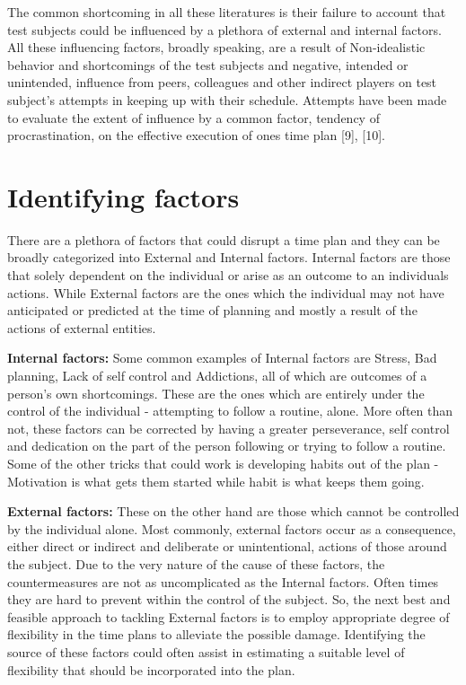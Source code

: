 \documentclass[conference]{IEEEtran}
\begin{document}
The common shortcoming in all these literatures is their failure to account that test subjects could be influenced by a plethora of external and internal factors. All these influencing factors, broadly speaking, are a result of Non-idealistic behavior and shortcomings of the test subjects and negative, intended or unintended, influence from peers, colleagues and other indirect players on test subject's attempts in keeping up with their schedule. Attempts have been made to evaluate the extent of influence by a common factor, tendency of procrastination, on the effective execution of ones time plan [9], [10].


\section{Identifying factors}
There are a plethora of factors that could disrupt a time plan and they can be broadly categorized into External and Internal factors. Internal factors are those that solely dependent on the individual or arise as an outcome to an individuals actions. While External factors are the ones which the individual may not have anticipated or predicted at the time of planning and mostly a result of the actions of external entities.

\textbf{Internal factors:} Some common examples of Internal factors are Stress, Bad planning, Lack of self control and Addictions, all of which are outcomes of a person's own shortcomings. These are the ones which are entirely under the control of the individual - attempting to follow a routine, alone. More often than not, these factors can be corrected by having a greater perseverance, self control and dedication on the part of the person following or trying to follow a routine. Some of the other tricks that could work is developing habits out of the plan - Motivation is what gets them started while habit is what keeps them going.

\textbf{External factors:} These on the other hand are those which cannot be controlled by the individual alone. Most commonly, external factors occur as a consequence, either direct or indirect and deliberate or unintentional, actions of those around the subject. Due to the very nature of the cause of these factors, the countermeasures are not as uncomplicated as the Internal factors. Often times they are hard to prevent within the control of the subject. So, the next best and feasible approach to tackling External factors is to employ appropriate degree of flexibility in the time plans to alleviate the possible damage. Identifying the source of these factors could often assist in estimating a suitable level of flexibility that should be incorporated into the plan. 
\end{document}
